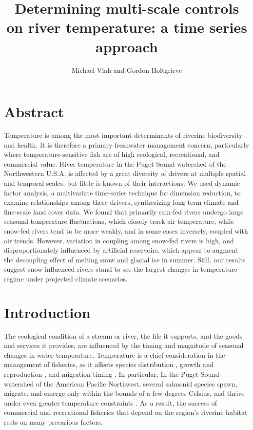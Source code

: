 \documentclass[notitlepage]{article}
\author{Michael Vlah and Gordon Holtgrieve}
\title{Determining multi-scale controls on river temperature: a time series approach}
\begin{document}

\maketitle
\clearpage


\section*{Abstract}
Temperature is among the most important determinants of riverine biodiversity and health. It is therefore a primary freshwater management concern, particularly where temperature-sensitive fish are of high ecological, recreational, and commercial value. River temperature in the Puget Sound watershed of the Northwestern U.S.A. is affected by a great diversity of drivers at multiple spatial and temporal scales, but little is known of their interactions. We used dynamic factor analysis, a multivariate time-series technique for dimension reduction, to examine relationships among these drivers, synthesizing long-term climate and fine-scale land cover data. We found that primarily rain-fed rivers undergo large seasonal temperature fluctuations, which closely track air temperature, while snow-fed rivers tend to be more weakly, and in some cases inversely, coupled with air trends. However, variation in coupling among snow-fed rivers is high, and disproportionately influenced by artificial reservoirs, which appear to augment the decoupling effect of melting snow and glacial ice in summer. Still, our results suggest snow-influenced rivers stand to see the largest changes in temperature regime under projected climate scenarios.

\clearpage

\section*{Introduction}

The ecological condition of a stream or river, the life it supports, and the goods and services it provides, are influenced by the timing and magnitude of seasonal changes in water temperature. Temperature is a chief consideration in the management of fisheries, as it affects species distribution \citep{Boisneau2008}, growth and reproduction \citep{mccullough1999review}, and migration timing \citep{boscarino2007effects}. In particular, In the Puget Sound watershed of the American Pacific Northwest, several salmonid species spawn, migrate, and emerge only within the bounds of a few degrees Celsius, and thrive under even greater temperature constraints \citep{carter2005effects}. As a result, the success of commercial and recreational fisheries that depend on the region's riverine habitat rests on many precarious factors.
\end{document}
